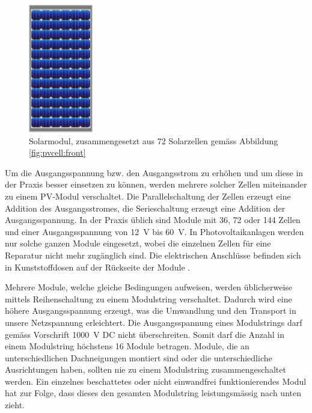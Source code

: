 \clearpage
\begin{figure}
    \centering
    \includegraphics[width=0.25\textwidth]{images/solar-facility/pvmodule.jpeg}
    \caption{
        Solarmodul,  zusammengesetzt  aus  72 Solarzellen  gem\"ass  Abbildung
        \ref{fig:pvcell:front}%
    }
    \label{fig:pvmodule}
\end{figure}


Um die  Ausgangsspannung bzw. den Ausgangsstrom  zu erh\"ohen und um  diese in
der  Praxis  besser  einsetzen  zu k\"onnen,  werden  mehrere  solcher  Zellen
miteinander zu  einem PV-Modul  verschaltet. Die Parallelschaltung  der Zellen
erzeugt  eine Addition  des Ausgangsstromes,  die Serieschaltung  erzeugt eine
Addition  der  Ausgangsspannung. In  der   Praxis  \"ublich  sind  Module  mit
36,  72  oder  144  Zellen   und  einer  Ausgangsspannung  von  \SI{12}{\volt}
bis  \SI{60}{\volt}. In Photovoltaikanlagen  werden nur  solche ganzen  Module
eingesetzt,   wobei  die   einzelnen   Zellen  f\"ur   eine  Reparatur   nicht
mehr  zug\"anglich  sind. Die  elektrischen   Anschl\"usse  befinden  sich  in
Kunststoffdosen auf der R\"uckseite der Module \cite{ref:pv:baunetz}.


Mehrere Module,  welche gleiche Bedingungen aufweisen,  werden \"ublicherweise
mittels Reihenschaltung  zu einem  Modulstring verschaltet. Dadurch  wird eine
h\"ohere Ausgangsspannung  erzeugt, was  die Umwandlung  und den  Transport in
unsere Netzspannung erleichtert. Die  Ausgangsspannung eines Modulstrings darf
gem\"ass Vorschrift \SI{1000}{\volt} DC  nicht \"uberschreiten. Somit darf die
Anzahl in einem Modulstring h\"ochstens 16 Module betragen. Module, die  an unterschiedlichen  Dachneigungen
montiert sind  oder die unterschiedliche  Ausrichtungen haben, sollten  nie zu
einem Modulstring  zusammengeschaltet werden. Ein einzelnes  beschattetes oder
nicht  einwandfrei  funktionierendes Modul  hat  zur  Folge, dass  dieses  den
gesamten Modulstring leistungsm\"assig nach unten zieht.

